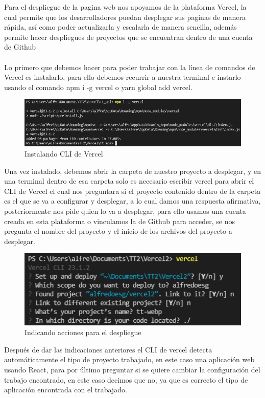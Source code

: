 \documentclass[12pt, a4paper, titlepage]{article}
\begin{document}
	Para el despliegue de la pagina web nos apoyamos de la plataforma Vercel, la cual permite que los desarrolladores puedan desplegar sus paginas de manera rápida, así como poder actualizarla y escalarla de manera sencilla, además permite hacer despliegues de proyectos que se encuentran dentro de una cuenta de Github\\\\
	Lo primero que debemos hacer para poder trabajar con la línea de comandos de Vercel es instalarlo, para ello debemos recurrir a nuestra terminal e instarlo usando el comando npm i -g vercel o yarn global add vercel.
	\begin{figure}[H]
		\includegraphics[width=12cm]{./Imagenes/Despliegue/Instalacion.png}
		\centering 
		\caption{Instalando CLI de Vercel}
	\end{figure}
	Una vez instalado, debemos abrir la carpeta de nuestro proyecto a desplegar, y en una terminal dentro de esa carpeta solo es necesario escribir vercel para abrir el CLI de Vercel el cual nos preguntara si el proyecto contenido dentro de la carpeta es el que se va a configurar y desplegar, a lo cual damos una respuesta afirmativa, posteriormente nos pide quien lo va a desplegar, para ello usamos una cuenta creada en esta plataforma o vinculamos la de Github para acceder, se nos pregunta el nombre del proyecto y el inicio de los archivos del proyecto a desplegar.
	\begin{figure}[H]
		\includegraphics[width=12cm]{./Imagenes/Despliegue/Acciones.png}
		\centering 
		\caption{Indicando acciones para el despliegue}
	\end{figure}
	Después de dar las indicaciones anteriores el CLI de vercel detecta automáticamente el tipo de proyecto trabajado, en este caso una aplicación web usando React, para por último preguntar si se quiere cambiar la configuración del trabajo encontrado, en este caso decimos que no, ya que es correcto el tipo de aplicación encontrada con el trabajado.
\end{document}
